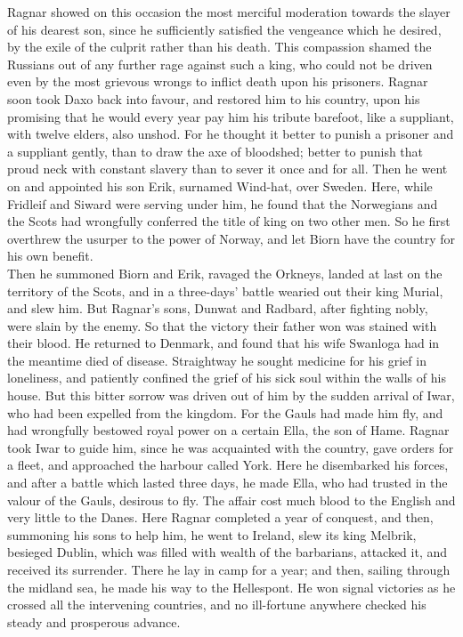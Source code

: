 \documentclass[10pt,a4paper]{report}
\begin{document}
Ragnar showed on this occasion the most merciful moderation towards the slayer of his dearest son, since he sufficiently satisfied the vengeance which he desired, by the exile of the culprit rather than his death. This compassion shamed the Russians out of any further rage against such a king, who could not be driven even by the most grievous wrongs to inflict death upon his prisoners. Ragnar soon took Daxo back into favour, and restored him to his country, upon his promising that he would every year pay him his tribute barefoot, like a suppliant, with twelve elders, also unshod. For he thought it better to punish a prisoner and a suppliant gently, than to draw the axe of bloodshed; better to punish that proud neck with constant slavery than to sever it once and for all. Then he went on and appointed his son Erik, surnamed Wind-hat, over Sweden. Here, while Fridleif and Siward were serving under him, he found that the Norwegians and the Scots had wrongfully conferred the title of king on two other men. So he first overthrew the usurper to the power of Norway, and let Biorn have the country for his own benefit.\\

Then he summoned Biorn and Erik, ravaged the Orkneys, landed at last on the territory of the Scots, and in a three-days' battle wearied out their king Murial, and slew him. But Ragnar's sons, Dunwat and Radbard, after fighting nobly, were slain by the enemy. So that the victory their father won was stained with their blood. He returned to Denmark, and found that his wife Swanloga had in the meantime died of disease. Straightway he sought medicine for his grief in loneliness, and patiently confined the grief of his sick soul within the walls of his house. But this bitter sorrow was driven out of him by the sudden arrival of Iwar, who had been expelled from the kingdom. For the Gauls had made him fly, and had wrongfully bestowed royal power on a certain Ella, the son of Hame. Ragnar took Iwar to guide him, since he was acquainted with the country, gave orders for a fleet, and approached the harbour called York. Here he disembarked his forces, and after a battle which lasted three days, he made Ella, who had trusted in the valour of the Gauls, desirous to fly. The affair cost much blood to the English and very little to the Danes. Here Ragnar completed a year of conquest, and then, summoning his sons to help him, he went to Ireland, slew its king Melbrik, besieged Dublin, which was filled with wealth of the barbarians, attacked it, and received its surrender. There he lay in camp for a year; and then, sailing through the midland sea, he made his way to the Hellespont. He won signal victories as he crossed all the intervening countries, and no ill-fortune anywhere checked his steady and prosperous advance.\\
\end{document}
